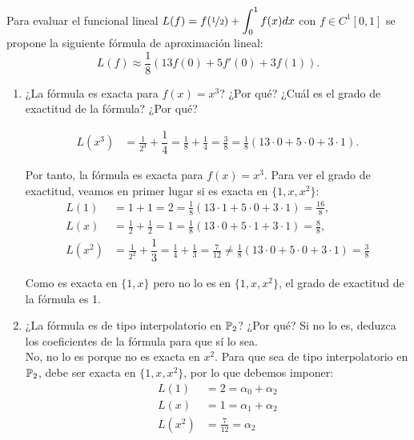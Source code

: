 \begin{ejercicio}\label{ej:2.1.10}
    Para evaluar el funcional lineal $\displaystyle L(f) = f(\nicefrac{1}{2}) + \int_{0}^{1} f(x) dx$ con $f \in C^1[0, 1]$ se propone la siguiente fórmula de aproximación lineal:
    \begin{equation*}
        L(f) \approx \frac{1}{8} (13f(0) + 5f'(0) + 3f(1)).
    \end{equation*}
    \begin{enumerate}
        \item ¿La fórmula es exacta para $f(x) = x^3$? ¿Por qué? ¿Cuál es el grado de exactitud de la fórmula? ¿Por qué?
        
        \begin{align*}
            L(x^3) &= \frac{1}{2^3} + \dfrac{1}{4} = \frac{1}{8} + \frac{1}{4} = \frac{3}{8} = \frac{1}{8} (13\cdot 0 + 5\cdot 0 + 3\cdot 1).
        \end{align*}

        Por tanto, la fórmula es exacta para $f(x) = x^3$. Para ver el grado de exactitud, veamos en primer lugar si es exacta en $\{1,x,x^2\}$:
        \begin{align*}
            L(1) &= 1 + 1 = 2 = \frac{1}{8} (13\cdot 1 + 5\cdot 0 + 3\cdot 1) = \frac{16}{8},\\
            L(x) &= \frac{1}{2} + \frac{1}{2} = 1 = \frac{1}{8} (13\cdot 0 + 5\cdot 1 + 3\cdot 1) = \frac{8}{8},\\
            L(x^2) &= \frac{1}{2^2} + \dfrac{1}{3} = \frac{1}{4} + \frac{1}{3} = \frac{7}{12} \neq \frac{1}{8} (13\cdot 0 + 5\cdot 0 + 3\cdot 1) = \frac{3}{8}
        \end{align*}

        Como es exacta en $\{1,x\}$ pero no lo es en $\{1,x,x^2\}$, el grado de exactitud de la fórmula es 1.
        \item ¿La fórmula es de tipo interpolatorio en $\mathbb{P}_2$? ¿Por qué? Si no lo es, deduzca los coeficientes de la fórmula para que sí lo sea.\\
        
        No, no lo es porque no es exacta en $x^2$. Para que sea de tipo interpolatorio en $\mathbb{P}_2$, debe ser exacta en $\{1,x,x^2\}$, por lo que debemos imponer:
        \begin{align*}
            L(1) &= 2 = \alpha_0 + \alpha_2\\
            L(x) &= 1 = \alpha_1 + \alpha_2\\
            L(x^2) &= \frac{7}{12} = \alpha_2
        \end{align*}


\end{enumerate}
\end{ejercicio}
